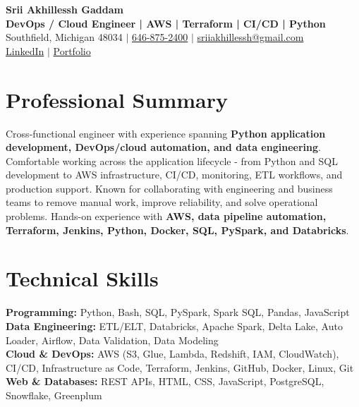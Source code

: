 \documentclass[letterpaper,10pt]{article}
\begin{document}
\fontsize{9.35pt}{10.45pt}\selectfont

\begin{center}
    {\LARGE \textbf{Srii Akhillessh Gaddam}} \\[-1pt]
    \textbf{DevOps / Cloud Engineer | AWS | Terraform | CI/CD | Python} \\[2pt]
    Southfield, Michigan 48034 $|$
    \href{tel:6468752400}{646-875-2400} $|$
    \href{mailto:sriiakhillessh@gmail.com}{sriiakhillessh@gmail.com} \\[1pt]
    \href{https://www.linkedin.com/in/srii-akhiilessh-gaddam-b48668191/}{LinkedIn} $|$
    \href{https://sriiakhillesshg.github.io/portfolio/}{Portfolio}
\end{center}
\vspace{-8pt}

\section{Professional Summary}
\small{Cross-functional engineer with experience spanning \textbf{Python application development, DevOps/cloud automation, and data engineering}. Comfortable working across the application lifecycle - from Python and SQL development to AWS infrastructure, CI/CD, monitoring, ETL workflows, and production support. Known for collaborating with engineering and business teams to remove manual work, improve reliability, and solve operational problems. Hands-on experience with \textbf{AWS, data pipeline automation, Terraform, Jenkins, Python, Docker, SQL, PySpark, and Databricks}.}

\section{Technical Skills}
\small{
\textbf{Programming:} Python, Bash, SQL, PySpark, Spark SQL, Pandas, JavaScript \\
\textbf{Data Engineering:} ETL/ELT, Databricks, Apache Spark, Delta Lake, Auto Loader, Airflow, Data Validation, Data Modeling \\
\textbf{Cloud \& DevOps:} AWS (S3, Glue, Lambda, Redshift, IAM, CloudWatch), CI/CD, Infrastructure as Code, Terraform, Jenkins, GitHub, Docker, Linux, Git \\
\textbf{Web \& Databases:} REST APIs, HTML, CSS, JavaScript, PostgreSQL, Snowflake, Greenplum
}
\end{document}
